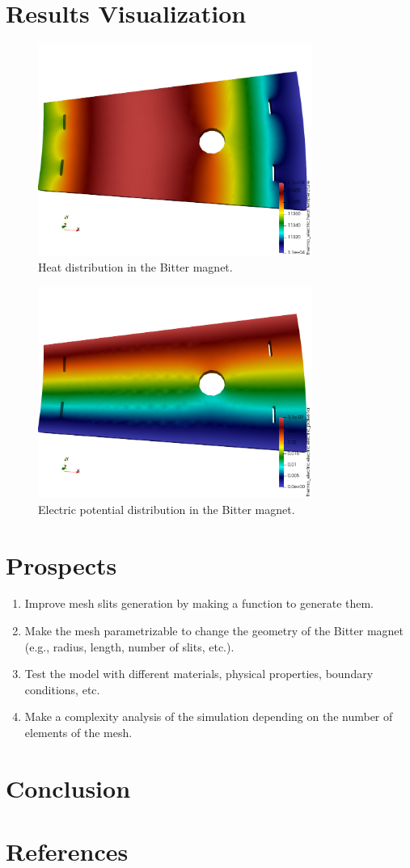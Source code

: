 \documentclass[12pt]{article}
\begin{document}
\section{Results Visualization}
\begin{figure}[H]
	\centering
	\includegraphics[width=0.8\textwidth]{images/heat.png}
	\caption{Heat distribution in the Bitter magnet.}
\end{figure}
\begin{figure}[H]
	\centering
	\includegraphics[width=0.8\textwidth]{images/electric_potential.png}
	\caption{Electric potential distribution in the Bitter magnet.}
\end{figure}


\section{Prospects}
\begin{enumerate}
	\item Improve mesh slits generation by making a function to generate them.
	\item Make the mesh parametrizable to change the geometry of the Bitter magnet 
	(e.g., radius, length, number of slits, etc.).
	\item Test the model with different materials, physical properties, boundary conditions, etc.
	\item Make a complexity analysis of the simulation depending on the number of elements of the mesh.
\end{enumerate}

\section{Conclusion}

\newpage

\section{References}
\printbibliography
\end{document}
